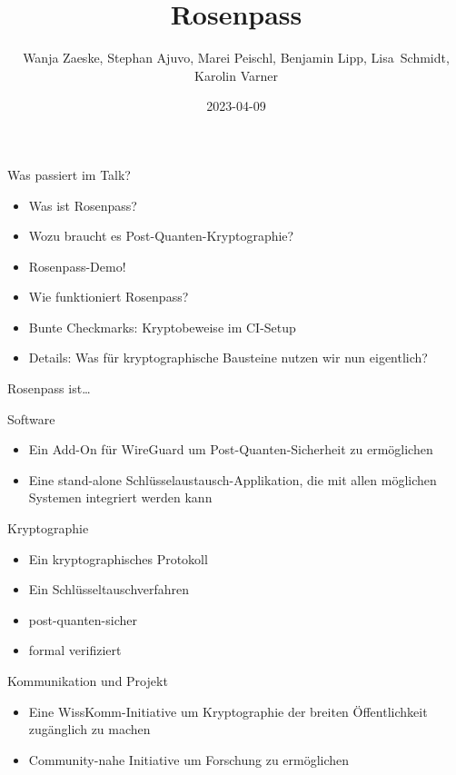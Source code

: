 \documentclass{rosenpass-beamer}
\title{Rosenpass}
\author{Wanja Zaeske, Stephan Ajuvo, Marei Peischl, Benjamin Lipp, Lisa~Schmidt, Karolin Varner}
\institute{\url{https://rosenpass.eu}}
\date{2023-04-09}
\begin{document}
\maketitle

\begin{frame}{Was passiert im Talk?}
\begin{itemize}
  \item Was ist Rosenpass?
  \item Wozu braucht es Post-Quanten-Kryptographie?
  \item Rosenpass-Demo!
  \item Wie funktioniert Rosenpass?
  \item Bunte Checkmarks: Kryptobeweise im CI-Setup
  \item Details: Was für kryptographische Bausteine nutzen wir nun eigentlich?
\end{itemize}
\end{frame}

\begin{frame}{Rosenpass ist…}

	Software
\begin{itemize}
  \item Ein Add-On für WireGuard um Post-Quanten-Sicherheit zu ermöglichen
  \item Eine stand-alone Schlüsselaustausch-Applikation, die mit allen möglichen Systemen integriert werden kann
\end{itemize}

Kryptographie
\begin{itemize}
  \item Ein kryptographisches Protokoll
  \item Ein Schlüsseltauschverfahren
  \item post-quanten-sicher
  \item formal verifiziert
\end{itemize}

Kommunikation und Projekt
\begin{itemize}
  \item Eine WissKomm-Initiative um Kryptographie der breiten Öffentlichkeit zugänglich zu machen
  \item Community-nahe Initiative um Forschung zu ermöglichen
\end{itemize}
\end{frame}

\end{document}
